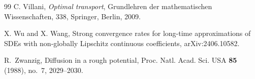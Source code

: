\documentclass[aap]{imsart}
\theoremstyle{plain}
\theoremstyle{definition}
\begin{document}
\begin{thebibliography}{99}
				\label{CV} C. Villani, {\it Optimal transport}, Grundlehren der mathematischen Wissenschaften, 338, Springer, Berlin, 2009.
				
				\label{Wu XM} X. Wu and X. Wang, Strong convergence rates for long-time approximations of SDEs with non-globally Lipschitz continuous coefficients, arXiv:2406.10582.
				
				\label{Zwanzig}
				R.~Zwanzig, Diffusion in a rough potential, Proc. Natl. Acad. Sci. USA {\bf 85} (1988), no.~7, 2029--2030.				
			\end{thebibliography}


%
%


\end{document}
